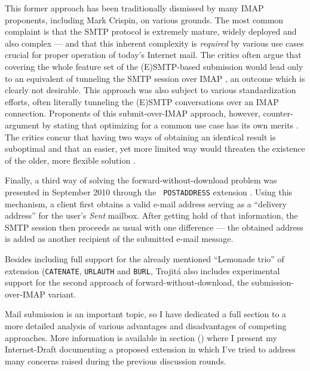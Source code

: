 \documentclass[trojita]{subfiles}
\begin{document}
This former approach has been traditionally dismissed by many IMAP proponents, including Mark Crispin, on various
grounds.  The most common complaint is that the SMTP protocol is extremely mature, widely deployed and also complex ---
and that this inherent complexity is {\em required} by various use cases crucial for proper operation of today's
Internet mail.  The critics often argue that covering the whole feature set of the (E)SMTP-based submission would lead
only to an equivalent of tunneling the SMTP session over IMAP \cite{crispin-smtp-tunneling}
\cite{cridland-imap-submission-sendmail-not-enough}, an outcome which is clearly not desirable.  This approach was
also subject to various standardization efforts, often literally tunneling the (E)SMTP conversations \cite[p.
30]{draft-maes-lemonade-p-imap} over an IMAP connection.  Proponents of this submit-over-IMAP approach, however,
counter-argument by stating that optimizing for a common use case has its own merits
\cite{brong-common-sendmail-makes-sense}.  The critics concur that having two ways of obtaining an identical result is
suboptimal and that an easier, yet more limited way would threaten the existence of the older, more flexible solution
\cite{crispin-submission-would-kill-smtp}.

Finally, a third way of solving the forward-without-download problem was presented in September 2010 through the {\tt
POSTADDRESS} extension \cite{draft-melnikov-imap-postaddress}.  Using this mechanism, a client first obtains a valid
e-mail address serving as a ``delivery address'' for the user's {\em Sent} mailbox.  After getting hold of that
information, the SMTP session then proceeds as usual with one difference --- the obtained address is added as another
recipient of the submitted e-mail message.

\begin{trojitabehavior}
Besides including full support for the already mentioned ``Lemonade trio'' of extension ({\tt CATENATE}, {\tt URLAUTH}
and {\tt BURL}, Trojitá also includes experimental support for the second approach of forward-without-download, the
submission-over-IMAP variant.
\end{trojitabehavior}

Mail submission is an important topic, so I have dedicated a full section to a more detailed analysis of various
advantages and disadvantages of competing approaches.  More information is available in section
() where I present my Internet-Draft documenting a proposed extension in which I've tried to
address many concerns raised during the previous discussion rounds.
\end{document}
